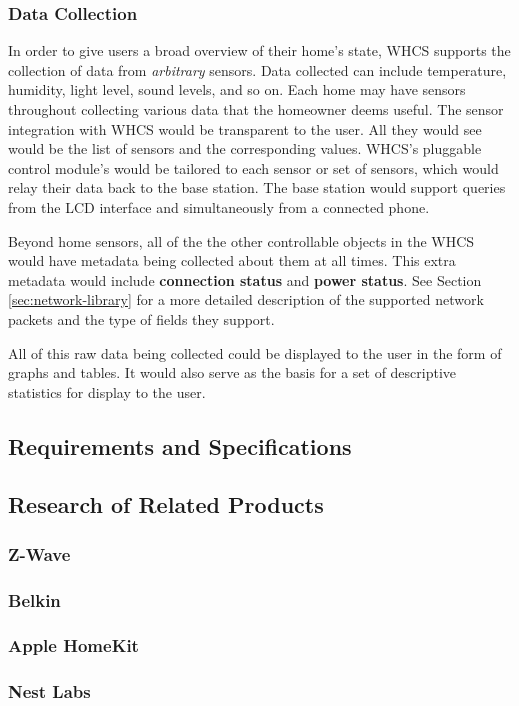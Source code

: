 \subsubsection{Data Collection}
In order to give users a broad overview of their home's state, WHCS supports
the collection of data from \emph{arbitrary} sensors. Data collected can
include temperature, humidity, light level, sound levels, and so on. Each home
may have sensors throughout collecting various data that the homeowner deems
useful. The sensor integration with WHCS would be transparent to the user. All
they would see would be the list of sensors and the corresponding values.
WHCS's pluggable control module's would be tailored to each sensor or set of
sensors, which would relay their data back to the base station. The base
station would support queries from the LCD interface and simultaneously from a
connected phone.

Beyond home sensors, all of the the other controllable objects in the WHCS
would have metadata being collected about them at all times. This extra metadata
would include \textbf{connection status} and \textbf{power status}. See Section
\ref{sec:network-library} for a more detailed description of the supported
network packets and the type of fields they support.

All of this raw data being collected could be displayed to the user in the form
of graphs and tables. It would also serve as the basis for a set of descriptive
statistics for display to the user.

\subsection{Requirements and Specifications}

\subsection{Research of Related Products}

\subsubsection{Z-Wave}

\subsubsection{Belkin}

\subsubsection{Apple HomeKit}

\subsubsection{Nest Labs}

